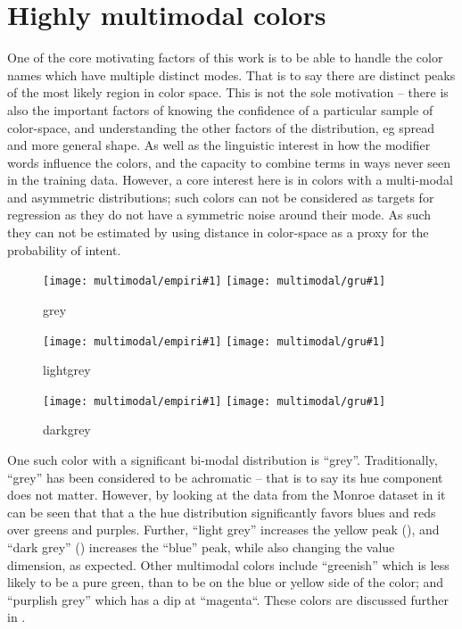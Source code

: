 \documentclass[11pt,letterpaper]{article}
\newcommand{\parencite}{\cite}
\begin{document}
\section{Highly multimodal colors}
One of the core motivating factors of this work is to be able to handle the color names which have multiple distinct modes.
That is to say there are distinct peaks of the most likely region in color space.
This is not the sole motivation -- there is also the important factors of knowing the confidence of a particular sample of color-space, and understanding the other factors of the distribution, eg spread and more general shape.
As well as the linguistic interest in how the modifier words influence the colors, and the capacity to combine terms in ways never seen in the training data.
However, a core interest here is in colors with a multi-modal and asymmetric distributions; such colors can not be considered as targets for regression as they do not have a symmetric noise around their mode.
As such they can not be estimated by using distance in color-space as a proxy for the probability of intent.


\newcommand{\multimodalfig}[1]{
\begin{figure}
	\texttt{[image: multimodal/empiri\#1]}
	\texttt{[image: multimodal/gru\#1]}	
	\caption{\label{fig#1} #1}
\end{figure}
}

\multimodalfig{grey}
\multimodalfig{lightgrey}
\multimodalfig{darkgrey}



One such color with a significant bi-modal distribution is ``grey''.
Traditionally, ``grey'' has been considered to be achromatic -- that is to say its hue component does not matter.
However, by looking at the data from the Monroe dataset \parencite{Monroe2010XKCDdataset} in  it can be seen that that a the hue distribution significantly favors blues and reds over greens and purples.
Further, ``light grey'' increases the yellow peak (), and ``dark grey'' () increases the ``blue'' peak, while also changing the value dimension, as expected.
Other multimodal colors include ``greenish'' which is less likely to be a pure green, than to be on the blue or yellow side of the color; 
and ``purplish grey'' which has a dip at ``magenta``.
These colors are discussed further in .
\end{document}
